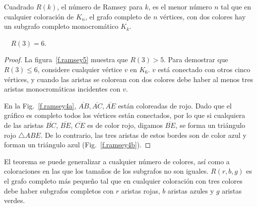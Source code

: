 \begin{definition}
Cuadrado $R(k)$, el número de Ramsey para $k$, es el menor número $n$ tal que en cualquier coloración de $K_{n}$, el grafo completo de $n$ vértices, con dos colores hay un subgrafo completo monocromático $K_k$.
\end{definition}
\begin{theorem}[Ramsey]
$\quad R(3)=6$.\label{thm.ramsey}
\end{theorem}

\begin{proof}
La figura~\ref{f.ramsey5} muestra que $R(3)>5$. Para demostrar que $R(3)\leq 6$, considere cualquier vértice $v$ en $K_6$. $v$ está conectado con otros cinco vértices, y cuando las aristas se colorean con dos colores debe haber al menos tres aristas monocromáticas incidentes con $v$. 

En la Fig.~\ref{f.ramsey4a}, $\overline{AB}, \overline{AC}, \overline{AE}$ están coloreadas de rojo. Dado que el gráfico es completo todos los vértices están conectados, por lo que si cualquiera de las aristas $\overline{BC}$, $\overline{BE}$, $\overline{CE}$ es de color rojo, digamos $\overline{BE}$, se forma un triángulo rojo $\triangle ABE$. De lo contrario, las tres aristas de estos bordes son de color azul y forman un triángulo azul (Fig.~\ref{f.ramsey4b}).
\end{proof}

El teorema se puede generalizar a cualquier número de colores, así como a coloraciones en las que los tamaños de los subgrafos no son iguales. $R(r,b,g)$ es el grafo completo más pequeño tal que en cualquier coloración con tres colores debe haber subgrafos completos con $r$ aristas rojas, $b$ aristas azules y $g$ aristas verdes.


